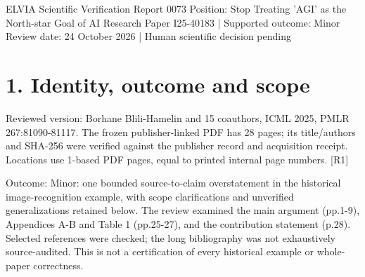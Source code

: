 \documentclass[10pt]{article}
\begin{document}
ELVIA Scientific Verification Report 0073
Position: Stop Treating ’AGI’ as the North-star Goal of AI Research
Paper I25-40183 | Supported outcome: Minor
Review date: 24 October 2026 | Human scientific decision pending\par
\section*{1. Identity, outcome and scope}
Reviewed version: Borhane Blili-Hamelin and 15 coauthors, ICML 2025, PMLR 267:81090-81117. The frozen publisher-linked PDF has 28 pages; its title/authors and SHA-256 were verified against the publisher record and acquisition receipt. Locations use 1-based PDF pages, equal to printed internal page numbers. [R1]\par
Outcome: Minor: one bounded source-to-claim overstatement in the historical image-recognition example, with scope clarifications and unverified generalizations retained below. The review examined the main argument (pp.1-9), Appendices A-B and Table 1 (pp.25-27), and the contribution statement (p.28). Selected references were checked; the long bibliography was not exhaustively source-audited. This is not a certification of every historical example or whole-paper correctness.\par
\end{document}
